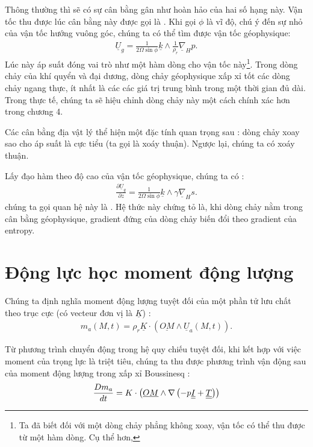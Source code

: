 \documentclass[DONG_HOC_KHI_QUYEN.tex]{subfiles}
\begin{document}
Thông thường thì sẽ có sự cân bằng gân như hoàn hảo của hai số hạng này. Vận tốc thu được lúc cân bằng này được gọi là . Khi gọi $\phi$ là vĩ độ, chú ý đến sự nhỏ của vận tốc hướng vuông góc, chúng ta có thể tìm được vận tốc géophysique:
\begin{equation}
    \begin{aligned}
        \underline{U}_g = \frac{1}{2\Omega\sin\phi}\underline{k}\wedge\frac{1}{\rho_r}\underline{\nabla}_H p.
    \end{aligned}
\end{equation}
Lúc này áp suất đóng vai trò như một hàm dòng cho vận tốc này\footnote{Ta đã biết đối với một dòng chảy phẳng không xoay, vận tốc có thể thu được từ một hàm dòng. Cụ thể hơn, }. Trong dòng chảy của khí quyển và đại dương, dòng chảy géophysique xấp xỉ tốt các dòng chảy ngang thực, ít nhất là các các giá trị trung bình trong một thời gian đủ dài. Trong thực tế, chúng ta sẽ hiệu chỉnh dòng chảy này một cách chính xác hơn trong chương 4.

Các cân bằng địa vật lý thể hiện một đặc tính quan trọng sau : dòng chảy xoay sao cho áp suất là cực tiểu (ta gọi là xoáy thuận). Ngược lại, chúng ta có xoáy thuận.

Lấy đạo hàm theo độ cao của vận tốc géophysique, chúng ta có :
\begin{equation}
    \begin{aligned}
        \frac{\partial\underline{U}_g}{\partial z} = \frac{1}{2\Omega\sin\phi}\underline{k}\wedge\gamma\underline{\nabla}_H s.
    \end{aligned}
\end{equation}
chúng ta gọi quan hệ này là . Hệ thức này chứng tỏ là, khi dòng chảy nằm trong cân bằng géophysique, gradient đứng của dòng chảy biến đổi theo gradient của entropy.
\section{Động lực học moment động lượng}
Chúng ta định nghĩa moment động lượng tuyệt đối của một phần tử lưu chất theo trục cực (có vecteur đơn vị là $\underline{K}$) :
\begin{equation}
    \begin{aligned}
        m_a(M,t)=\rho_r\underline{K}\cdot(\underline{OM}\wedge\underline{U}_a(M,t)).
    \end{aligned}
\end{equation}

Từ phương trình chuyển động trong hệ quy chiếu tuyệt đối, khi kết hợp với việc moment của trọng lực là triệt tiêu, chúng ta thu được phương trình vận động sau của moment động lượng trong xấp xỉ Boussinesq :
\begin{equation}
    \begin{aligned}
        \frac{{D{m_a}}}{{dt}} = K \cdot \left( {\underline {OM}  \wedge \nabla \left( { - p\underline{\underline{I}} + \underline{\underline{T}}} \right)} \right)
    \end{aligned}
\end{equation}
\end{document}
